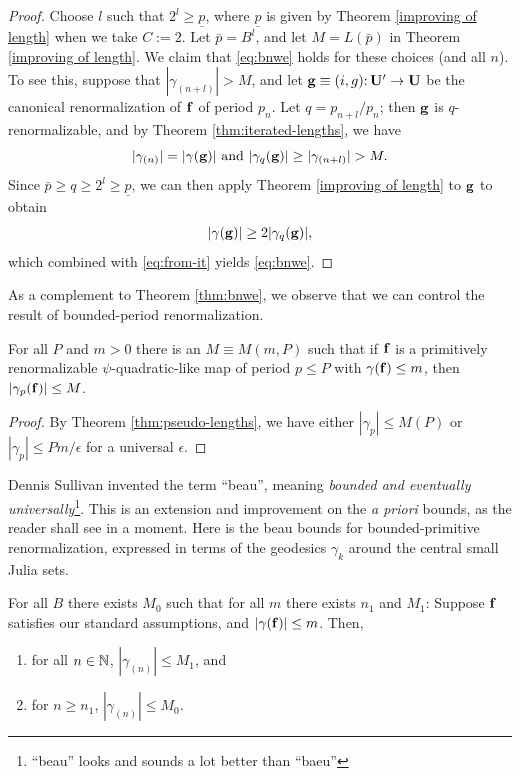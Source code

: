\begin{proof}
Choose $l$ such that $2^l \ge \underline p$, 
where $\underline p$ is given by Theorem \ref{improving of length} when we take $C := 2$.
Let $\bar p = B^l$,
and let $M = L(\bar p)$ in Theorem \ref{improving of length}. 
We claim that \eqref{eq:bnwe} holds for these choices (and all $n$).
To see this,
suppose that $|\gamma_{(n+l)}| > M$,
and let $\mathbf g \equiv (i, g)\mathpunct: \mathbf U' \to \mathbf U$ be the canonical renormalization of $\mathbf f$ of period $p_n$.
Let $q = p_{n+l}/p_n$;
then $\mathbf g$ is $q$-renormalizable,
and by Theorem \ref{thm:iterated-lengths},
we have 
\begin{equation} \label{eq:from-it}
|\gamma_{(n)}| = |\gamma(\mathbf g)| \text{ and } |\gamma_q(\mathbf g)| \ge |\gamma_{(n+l)}| > M.
\end{equation}
Since $\bar p \ge q \ge 2^l \ge \underline p$,
we can then apply Theorem \ref{improving of length} to $\mathbf g$ to obtain
$$
|\gamma(\mathbf g)| \ge 2 |\gamma_q(\mathbf g)|, 
$$
which combined with \eqref{eq:from-it} yields \eqref{eq:bnwe}.
\end{proof}

As a complement to Theorem \ref{thm:bnwe},
we observe that we can control the result of bounded-period renormalization. 
\begin{lemma} \label{lem:local-bound}
For all $P$ and $m > 0$ there is an $M \equiv M(m, P)$ such that 
if $\mathbf f$ is a primitively renormalizable $\psi$-quadratic-like map of period $p \le P$ with $\gamma(\mathbf f) \le m$,
then $|\gamma_p(\mathbf f)| \le M$.
\end{lemma}
\begin{proof}
By Theorem \ref{thm:pseudo-lengths},
we have either $|\gamma_p| \le M(P)$ or $| \gamma_p | \le Pm /\epsilon$ for a universal $\epsilon$.
\end{proof}

Dennis Sullivan \cite{S} invented the term ``beau'', meaning \emph{bounded and eventually universally}\footnote{``beau'' looks and sounds a lot better than ``baeu''}. 
This is an extension and improvement on the \emph{a priori} bounds,
as the reader shall see in a moment. 
Here is the beau bounds for bounded-primitive renormalization, 
expressed in terms of the geodesics $\gamma_k$ around the central small Julia sets.
\begin{theorem} \label{thm:psi-beau}
For all $B$ there exists $M_0$ such that for all $m$ there exists $n_1$ and $M_1$:
Suppose $\mathbf f$ satisfies our standard assumptions, and $| \gamma(\mathbf f) | \le m$.
Then,
\begin{enumerate}
\item
for all $n\in {\Bbb N}$, $|\gamma_{(n)}| \le M_1$, and
\item
for $n \ge n_1$, $|\gamma_{(n)}| \le M_0$. 
\end{enumerate}
\end{theorem}

